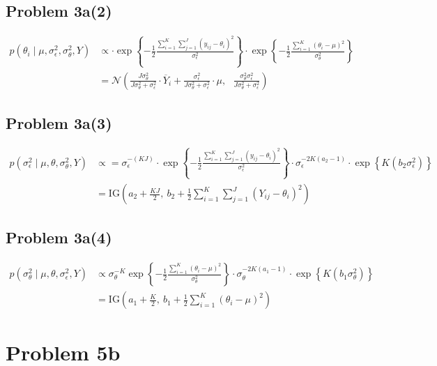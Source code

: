 \documentclass[12pt, letterpaper]{article}
\begin{document}
\subsection*{Problem 3a(2)} 
\begin{align*}
p(\theta_i \mid \mu, \sigma^2_\epsilon, \sigma^2_\theta, Y) & \propto 
\cdot \exp \left\{ - \frac{1}{2} \frac{\sum_{i=1}^K \sum_{j=1}^J (y_{ij}  - \theta_i)^2}
{\sigma^2_\epsilon} \right\}  \cdot 
\exp \left\{ - \frac{1}{2} \frac{\sum_{i=1}^K (\theta_i - \mu)^2}
{\sigma^2_\theta } \right\} 
\\[0.5ex]
& =  \mathcal{N} \left( 
\frac{J\sigma^2_\theta}{J\sigma^2_\theta + \sigma_\epsilon^2} \cdot \overline{Y}_i
+ 
\frac{\sigma^2_\epsilon}{J\sigma^2_\theta + \sigma_\epsilon^2} \cdot \mu
, \ \ \ 
\frac{\sigma^2_\theta \sigma^2_\epsilon}{J\sigma^2_\theta + \sigma_\epsilon^2}
\right) 
\end{align*}

\subsection*{Problem 3a(3)}
\begin{align*} 
p(\sigma^2_\epsilon \mid \mu, \theta, \sigma^2_\theta, Y)   & \propto 
 = 
\sigma_\epsilon^{-(KJ)} \cdot \exp \left\{ - \frac{1}{2} \frac{\sum_{i=1}^K \sum_{j=1}^J (y_{ij}  - \theta_i)^2}
{\sigma^2_\epsilon} \right\}  
 \cdot 
\sigma_\epsilon^{-2K(a_2 - 1)} \cdot 
\exp \left\{ K \left( 
 b_2 \sigma^2_\epsilon 
\right) \right\} 
\\[0.5ex]
& =\text{IG}
\left(
a_2 + \frac{KJ}{2}, \ 
b_2 + \frac{1}{2} \sum_{i=1}^K \sum_{j=1}^J (Y_{ij} - \theta_i)^2
\right)
\end{align*} 

\subsection*{Problem 3a(4)} 
\begin{align*}
p(\sigma^2_\theta \mid \mu, \theta, \sigma^2_\epsilon, Y)  & \propto 
\sigma_\theta^{-K} \exp \left\{ - \frac{1}{2} \frac{\sum_{i=1}^K (\theta_i - \mu)^2}
{\sigma^2_\theta } \right\} 
 \cdot  
\sigma_\theta^{-2K(a_1 - 1)} \cdot 
\exp \left\{ K \left( 
 b_1 \sigma^2_\theta 
\right) \right\} 
\\[0.5ex]
& = \text{IG}
\left(
a_1 + \frac{K}{2}
, \ 
b_1 + \frac{1}{2} \sum_{i=1}^K  (\theta_i - \mu)^2
\right)
\end{align*}


\newpage 
\section*{Problem 5b} 
\end{document}
